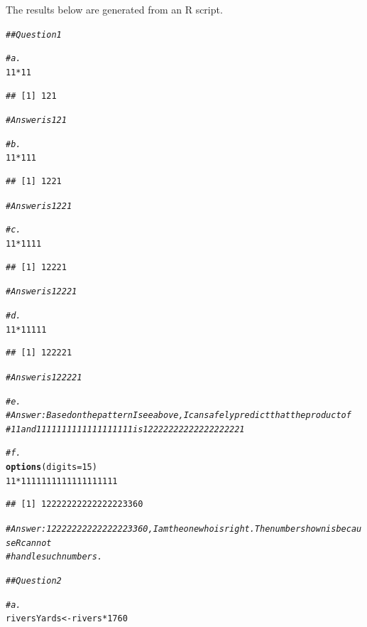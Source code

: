 \documentclass{article}\usepackage[]{graphicx}\usepackage[]{xcolor}
\makeatletter
\newcommand{\hlnum}[1]{\textcolor[rgb]{0.686,0.059,0.569}{#1}}%
\newcommand{\hlcom}[1]{\textcolor[rgb]{0.678,0.584,0.686}{\textit{#1}}}%
\newcommand{\hlopt}[1]{\textcolor[rgb]{0,0,0}{#1}}%
\newcommand{\hlstd}[1]{\textcolor[rgb]{0.345,0.345,0.345}{#1}}%
\newcommand{\hlkwb}[1]{\textcolor[rgb]{0.69,0.353,0.396}{#1}}%
\newcommand{\hlkwc}[1]{\textcolor[rgb]{0.333,0.667,0.333}{#1}}%
\newcommand{\hlkwd}[1]{\textcolor[rgb]{0.737,0.353,0.396}{\textbf{#1}}}%
\newenvironment{kframe}{%
 \def\at@end@of@kframe{}%
 \ifinner\ifhmode%
  \def\at@end@of@kframe{\end{minipage}}%
  \begin{minipage}{\columnwidth}%
 \fi\fi%
 \def\FrameCommand##1{\hskip\@totalleftmargin \hskip-\fboxsep
 \colorbox{shadecolor}{##1}\hskip-\fboxsep
     \hskip-\linewidth \hskip-\@totalleftmargin \hskip\columnwidth}%
 \MakeFramed {\advance\hsize-\width
   \@totalleftmargin\z@ \linewidth\hsize
   \@setminipage}}%
 {\par\unskip\endMakeFramed%
 \at@end@of@kframe}
\newenvironment{knitrout}{}{} %
\makeatother
\begin{document}
The results below are generated from an R script.

\begin{knitrout}
\color{fgcolor}\begin{kframe}
\begin{alltt}
\hlcom{##Question 1}

\hlcom{#a.}
\hlnum{11} \hlopt{*} \hlnum{11}
\end{alltt}
\begin{verbatim}
## [1] 121
\end{verbatim}
\begin{alltt}
\hlcom{#Answer is 121}

\hlcom{#b.}
\hlnum{11} \hlopt{*} \hlnum{111}
\end{alltt}
\begin{verbatim}
## [1] 1221
\end{verbatim}
\begin{alltt}
\hlcom{#Answer is 1221}

\hlcom{#c.}
\hlnum{11} \hlopt{*} \hlnum{1111}
\end{alltt}
\begin{verbatim}
## [1] 12221
\end{verbatim}
\begin{alltt}
\hlcom{#Answer is 12221}

\hlcom{#d.}
\hlnum{11} \hlopt{*} \hlnum{11111}
\end{alltt}
\begin{verbatim}
## [1] 122221
\end{verbatim}
\begin{alltt}
\hlcom{#Answer is 122221}

\hlcom{#e.}
\hlcom{#Answer: Based on the pattern I see above, I can safely predict that the product of}
\hlcom{# 11 and 1111111111111111111 is 12222222222222222221}

\hlcom{#f.}
\hlkwd{options}\hlstd{(}\hlkwc{digits}\hlstd{=}\hlnum{15}\hlstd{)}
\hlnum{11} \hlopt{*} \hlnum{1111111111111111111}
\end{alltt}
\begin{verbatim}
## [1] 12222222222222223360
\end{verbatim}
\begin{alltt}
\hlcom{#Answer: 12222222222222223360, I am the one who is right. The number shown is because R cannot}
\hlcom{#handle such numbers.}

\hlcom{##Question 2}

\hlcom{#a.}
\hlstd{riversYards} \hlkwb{<-} \hlstd{rivers} \hlopt{*} \hlnum{1760}


\end{alltt}
\end{kframe}
\end{knitrout}
\end{document}
